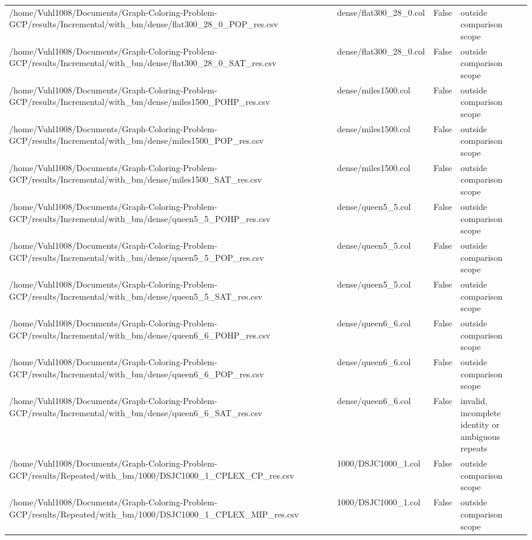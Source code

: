 \begin{table}[htbp]
\begin{tabular}{llll}
/home/Vuhl1008/Documents/Graph-Coloring-Problem-GCP/results/Incremental/with\_bm/dense/flat300\_28\_0\_POP\_res.csv & dense/flat300\_28\_0.col & False & outside comparison scope \\
/home/Vuhl1008/Documents/Graph-Coloring-Problem-GCP/results/Incremental/with\_bm/dense/flat300\_28\_0\_SAT\_res.csv & dense/flat300\_28\_0.col & False & outside comparison scope \\
/home/Vuhl1008/Documents/Graph-Coloring-Problem-GCP/results/Incremental/with\_bm/dense/miles1500\_POHP\_res.csv & dense/miles1500.col & False & outside comparison scope \\
/home/Vuhl1008/Documents/Graph-Coloring-Problem-GCP/results/Incremental/with\_bm/dense/miles1500\_POP\_res.csv & dense/miles1500.col & False & outside comparison scope \\
/home/Vuhl1008/Documents/Graph-Coloring-Problem-GCP/results/Incremental/with\_bm/dense/miles1500\_SAT\_res.csv & dense/miles1500.col & False & outside comparison scope \\
/home/Vuhl1008/Documents/Graph-Coloring-Problem-GCP/results/Incremental/with\_bm/dense/queen5\_5\_POHP\_res.csv & dense/queen5\_5.col & False & outside comparison scope \\
/home/Vuhl1008/Documents/Graph-Coloring-Problem-GCP/results/Incremental/with\_bm/dense/queen5\_5\_POP\_res.csv & dense/queen5\_5.col & False & outside comparison scope \\
/home/Vuhl1008/Documents/Graph-Coloring-Problem-GCP/results/Incremental/with\_bm/dense/queen5\_5\_SAT\_res.csv & dense/queen5\_5.col & False & outside comparison scope \\
/home/Vuhl1008/Documents/Graph-Coloring-Problem-GCP/results/Incremental/with\_bm/dense/queen6\_6\_POHP\_res.csv & dense/queen6\_6.col & False & outside comparison scope \\
/home/Vuhl1008/Documents/Graph-Coloring-Problem-GCP/results/Incremental/with\_bm/dense/queen6\_6\_POP\_res.csv & dense/queen6\_6.col & False & outside comparison scope \\
/home/Vuhl1008/Documents/Graph-Coloring-Problem-GCP/results/Incremental/with\_bm/dense/queen6\_6\_SAT\_res.csv & dense/queen6\_6.col & False & invalid, incomplete identity or ambiguous repeats \\
/home/Vuhl1008/Documents/Graph-Coloring-Problem-GCP/results/Repeated/with\_bm/1000/DSJC1000\_1\_CPLEX\_CP\_res.csv & 1000/DSJC1000\_1.col & False & outside comparison scope \\
/home/Vuhl1008/Documents/Graph-Coloring-Problem-GCP/results/Repeated/with\_bm/1000/DSJC1000\_1\_CPLEX\_MIP\_res.csv & 1000/DSJC1000\_1.col & False & outside comparison scope \\

\end{tabular}
\end{table}
